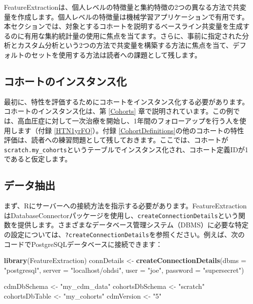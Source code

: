 \documentclass[
  11pt]{book}
\newenvironment{Shaded}{\begin{snugshade}}{\end{snugshade}}
\newcommand{\AttributeTok}[1]{\textcolor[rgb]{0.13,0.29,0.53}{#1}}
\newcommand{\FunctionTok}[1]{\textcolor[rgb]{0.13,0.29,0.53}{\textbf{#1}}}
\newcommand{\NormalTok}[1]{#1}
\newcommand{\OtherTok}[1]{\textcolor[rgb]{0.56,0.35,0.01}{#1}}
\newcommand{\StringTok}[1]{\textcolor[rgb]{0.31,0.60,0.02}{#1}}
\theoremstyle{definition}
\theoremstyle{definition}
\theoremstyle{definition}
\theoremstyle{definition}
\theoremstyle{remark}
\begin{document}
FeatureExtractionは、個人レベルの特徴量と集約特徴の2つの異なる方法で共変量を作成します。個人レベルの特徴量は機械学習アプリケーションで有用です。本セクションでは、対象とするコホートを説明するベースライン共変量を生成するのに有用な集約統計量の使用に焦点を当てます。さらに、事前に指定された分析とカスタム分析という2つの方法で共変量を構築する方法に焦点を当て、デフォルトのセットを使用する方法は読者への課題として残します。

\subsection{コホートのインスタンス化}\label{ux30b3ux30dbux30fcux30c8ux306eux30a4ux30f3ux30b9ux30bfux30f3ux30b9ux5316}

最初に、特性を評価するためにコホートをインスタンス化する必要があります。コホートのインスタンス化は、第 \ref{Cohorts} 章で説明されています。この例では、高血圧症に対して一次治療を開始し、1年間のフォローアップを行う人を使用します（付録 \ref{HTN1yrFO}）。付録 \ref{CohortDefinitions}の他のコホートの特性評価は、読者への練習問題として残しておきます。ここでは、コホートが\texttt{scratch.my\_cohorts}というテーブルでインスタンス化され、コホート定義IDが1であると仮定します。

\subsection{データ抽出}\label{ux30c7ux30fcux30bfux62bdux51fa}

まず、Rにサーバーへの接続方法を指示する必要があります。FeatureExtractionはDatabaseConnectorパッケージを使用し、\texttt{createConnectionDetails}という関数を提供します。さまざまなデータベース管理システム（DBMS）に必要な特定の設定については、\texttt{?createConnectionDetails}を参照ください。例えば、次のコードでPostgreSQLデータベースに接続できます：

\begin{Shaded}
\begin{Highlighting}[]
\FunctionTok{library}\NormalTok{(FeatureExtraction)}
\NormalTok{connDetails }\OtherTok{\textless{}{-}} \FunctionTok{createConnectionDetails}\NormalTok{(}\AttributeTok{dbms =} \StringTok{"postgresql"}\NormalTok{,}
                                       \AttributeTok{server =} \StringTok{"localhost/ohdsi"}\NormalTok{,}
                                       \AttributeTok{user =} \StringTok{"joe"}\NormalTok{,}
                                       \AttributeTok{password =} \StringTok{"supersecret"}\NormalTok{)}

\NormalTok{cdmDbSchema }\OtherTok{\textless{}{-}} \StringTok{"my\_cdm\_data"}
\NormalTok{cohortsDbSchema }\OtherTok{\textless{}{-}} \StringTok{"scratch"}
\NormalTok{cohortsDbTable }\OtherTok{\textless{}{-}} \StringTok{"my\_cohorts"}
\NormalTok{cdmVersion }\OtherTok{\textless{}{-}} \StringTok{"5"}
\end{Highlighting}
\end{Shaded}
\end{document}
